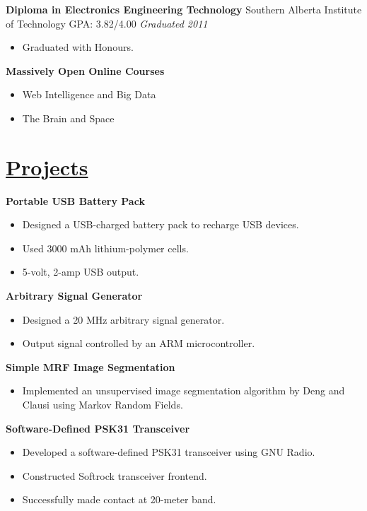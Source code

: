\documentclass[a4paper, 11pt]{article}
\begin{document}
  \textbf{Diploma in Electronics Engineering Technology}
  \hfill
  Southern Alberta Institute of Technology
  GPA: 3.82/4.00
  \hfill
  \emph{Graduated 2011}
  \begin{itemize}[nosep]
    \item Graduated with Honours.
  \end{itemize}
  \medskip
  
  \textbf{Massively Open Online Courses}
  \begin{itemize}[nosep]
    \item Web Intelligence and Big Data
    \item The Brain and Space
  \end{itemize}
  
\section{\underline{Projects}}
  \textbf{Portable USB Battery Pack}
  \begin{itemize}[nosep]
    \item Designed a USB-charged battery pack to recharge USB devices.
    \item Used 3000 mAh lithium-polymer cells.
    \item 5-volt, 2-amp USB output.
  \end{itemize}
  \medskip

  \textbf{Arbitrary Signal Generator}  
  \begin{itemize}[nosep]
    \item Designed a 20 MHz arbitrary signal generator.
    \item Output signal controlled by an ARM microcontroller.    
  \end{itemize}
  \medskip
  
  \textbf{Simple MRF Image Segmentation}
  \begin{itemize}[nosep]
    \item Implemented an unsupervised image segmentation algorithm by Deng and Clausi using Markov Random Fields.
  \end{itemize}
  \medskip

  \textbf{Software-Defined PSK31 Transceiver}
  \begin{itemize}[nosep]
    \item Developed a software-defined PSK31 transceiver using GNU Radio.
    \item Constructed Softrock transceiver frontend.
    \item Successfully made contact at 20-meter band.
  \end{itemize}
  \medskip
  
\end{document}
